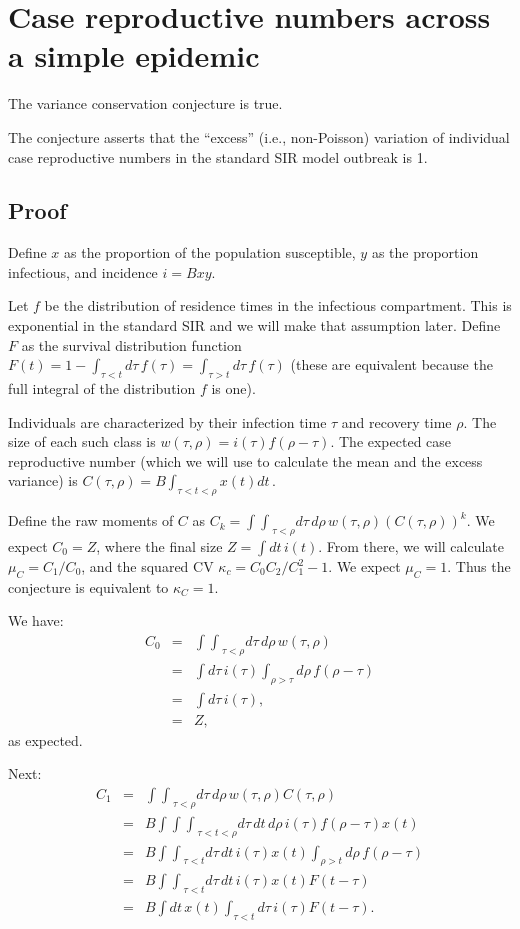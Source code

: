 \documentclass[12pt]{article}
\newcommand{\dt}{dt\,}
\newcommand{\dtau}{d\tau\,}
\newcommand{\drho}{d\rho\,}
\newcommand{\intint}{{\int\!\!\int}}
\newcommand{\intintint}{{\int\!\!\int\!\!\int}}
\newcommand{\eqlab}[1]{\label{eq:#1}}
\begin{document}
\section*{Case reproductive numbers across a simple epidemic}

The variance conservation conjecture is true.

The conjecture asserts that the “excess” (i.e., non-Poisson) variation of individual case reproductive numbers in the standard SIR model outbreak is 1.

\subsection*{Proof}
Define $x$ as the proportion of the population susceptible, $y$ as the proportion infectious, and incidence $i = Bxy$.

Let $f$ be the distribution of residence times in the infectious compartment. This is exponential in the standard SIR and we will make that assumption later. Define $F$ as the survival distribution function
$F(t)
	= 1 -\int_{\tau<t} \dtau f(\tau)
	= \int_{\tau>t} \dtau f(\tau)
$ (these are equivalent because the full integral of the distribution $f$ is one).

Individuals are characterized by their infection time $\tau$ and recovery time $\rho$. The size of each such class is $w(\tau, \rho) = i(\tau) f(\rho-\tau)$. The expected case reproductive number (which we will use to calculate the mean and the excess variance) is $C(\tau, \rho) = B \int_{\tau<t<\rho} x(t) \dt$.

Define the raw moments of $C$ as $C_k = \intint_{\tau<\rho} \dtau\drho w(\tau, \rho) (C(\tau, \rho))^k$.
We expect $C_0=Z$, where the final size $Z = \int\dt i(t)$. From there, we will calculate $\mu_C = C_1/C_0$, and the squared CV $\kappa_c = C_0C_2/C_1^2-1$. We expect $\mu_C=1$. Thus the conjecture is equivalent to $\kappa_C = 1$.

We have:
\begin{eqnarray}
	C_0
	&=& \intint_{\tau<\rho} \dtau\drho w(\tau, \rho)
	\\ &=& \int \dtau i(\tau) \int_{\rho>\tau} \drho f(\rho-\tau)
	\\ &=& \int \dtau i(\tau),
	\\ &=& Z,
\end{eqnarray}
as expected.

Next:
\begin{eqnarray}
	C_1
	&=& \intint_{\tau<\rho} \dtau\drho w(\tau, \rho) C(\tau, \rho)
	\\ &=& B \intintint_{\tau<t<\rho} \dtau\dt\drho
		i(\tau) f(\rho-\tau) x(t)
	\\ &=& B \intint_{\tau<t} \dtau\dt i(\tau) x(t)
		\int_{\rho>t} \drho f(\rho-\tau)
	\\ &=& B \intint_{\tau<t} \dtau\dt i(\tau) x(t) F(t-\tau)
	\\ &=& B \int \dt x(t) \int_{\tau<t}\dtau i(\tau) F(t-\tau).
	\eqlab{C1pre}
\end{eqnarray}
\end{document}

